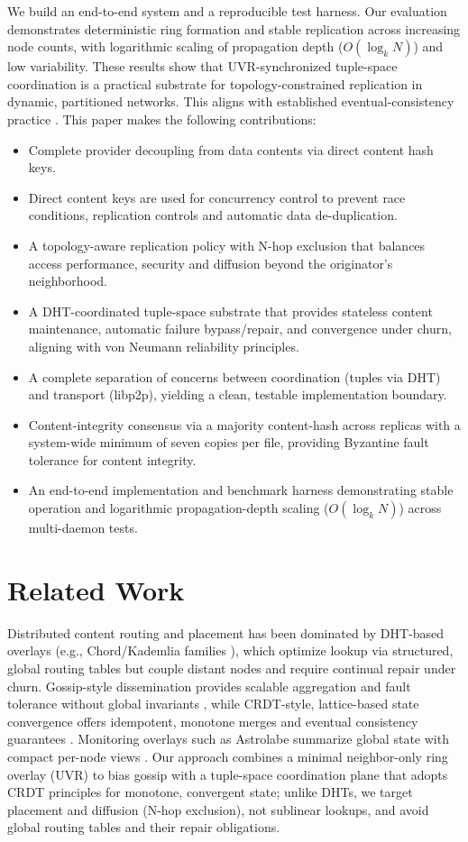 \documentclass[runningheads]{llncs}
\begin{document}
We build an end-to-end system and a reproducible test harness. Our evaluation demonstrates deterministic ring formation and stable replication across increasing node counts, with logarithmic scaling of propagation depth ($O(\log_k N)$) and low variability. These results show that UVR-synchronized tuple-space coordination is a practical substrate for topology-constrained replication in dynamic, partitioned networks. This aligns with established eventual-consistency practice \cite{Burckhardt2014EC}.
This paper makes the following contributions:
\begin{itemize}
    \item Complete provider decoupling from data contents via direct content hash keys.
    \item Direct content keys are used for concurrency control to prevent race conditions, replication controls and automatic data de-duplication.
    \item A topology-aware replication policy with N-hop exclusion that balances access performance, security and diffusion beyond the originator’s neighborhood.
    \item A DHT-coordinated tuple-space substrate that provides stateless content maintenance, automatic failure bypass/repair, and convergence under churn, aligning with von Neumann reliability principles.
    \item A complete separation of concerns between coordination (tuples via DHT) and transport (libp2p), yielding a clean, testable implementation boundary.
    \item Content-integrity consensus via a majority content-hash across replicas with a system-wide minimum of seven copies per file, providing Byzantine fault tolerance for content integrity.
    \item An end-to-end implementation and benchmark harness demonstrating stable operation and logarithmic propagation-depth scaling ($O(\log_k N)$) across multi-daemon tests.
\end{itemize}

\section{Related Work}
\label{sec:related-work}
Distributed content routing and placement has been dominated by DHT-based overlays (e.g., Chord/Kademlia families \cite{StoicaChord01}), which optimize lookup via structured, global routing tables but couple distant nodes and require continual repair under churn. Gossip-style dissemination provides scalable aggregation and fault tolerance without global invariants \cite{Jelasity2005Gossip}, while CRDT-style, lattice-based state convergence offers idempotent, monotone merges and eventual consistency guarantees \cite{ShapiroCRDT2011,BaqueroPureOpCRDT2017,Burckhardt2014EC}. Monitoring overlays such as Astrolabe summarize global state with compact per-node views \cite{Astrolabe2003}. Our approach combines a minimal neighbor-only ring overlay (UVR) to bias gossip with a tuple-space coordination plane that adopts CRDT principles for monotone, convergent state; unlike DHTs, we target placement and diffusion (N-hop exclusion), not sublinear lookups, and avoid global routing tables and their repair obligations.
\end{document}
